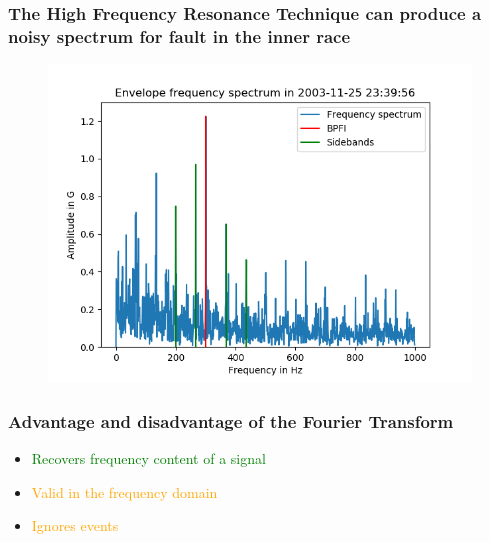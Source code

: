 \documentclass{beamer}
\begin{document}

\begin{frame}
	\frametitle{The High Frequency Resonance Technique can produce a noisy spectrum for fault in the inner race}
	\begin{figure}[H]
		\centering
		\includegraphics[width=0.8\linewidth]{bpfi_sidebands}
	\end{figure}
\end{frame}

\begin{frame}
	\frametitle{Advantage and disadvantage of the Fourier Transform}
	\begin{itemize}
		\item \textcolor{green}{Recovers frequency content of a signal}
		\item \textcolor{orange}{Valid in the frequency domain}
		\item \textcolor{orange}{Ignores events}
	\end{itemize}
\end{frame}

\end{document}

